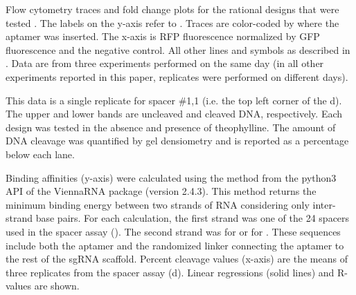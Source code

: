 \documentclass[10pt,oneside]{article}
\begin{document}


      Flow cytometry traces and fold change plots for the rational designs that were tested \invivo{}.  The labels on the y-axis refer to .  Traces are color-coded by where the aptamer was inserted.  The x-axis is RFP fluorescence normalized by GFP fluorescence and the negative control.  All other lines and symbols as described in .  Data are from three experiments performed on the same day (in all other experiments reported in this paper, replicates were performed on different days).



      This data is a single replicate for spacer \#1,1 (i.e. the top left corner of the d).  The upper and lower bands are uncleaved and cleaved DNA, respectively.  Each design was tested in the absence and presence of theophylline.  The amount of DNA cleavage was quantified by gel densiometry and is reported as a percentage below each lane.



     Binding affinities (y-axis) were calculated using the  method from the python3 API of the ViennaRNA package (version 2.4.3).  This method returns the minimum binding energy between two strands of RNA considering only inter-strand base pairs.  For each calculation, the first strand was one of the 24  spacers used in the \invitro{} spacer assay ().  The second strand was  for \ligrnaF{} or  for \ligrnaB{}.  These sequences include both the aptamer and the randomized linker connecting the aptamer to the rest of the sgRNA scaffold.  Percent cleavage values (x-axis) are the means of three replicates from the \invitro{} spacer assay (d).  Linear regressions (solid lines) and R-values are shown.

\end{document}
